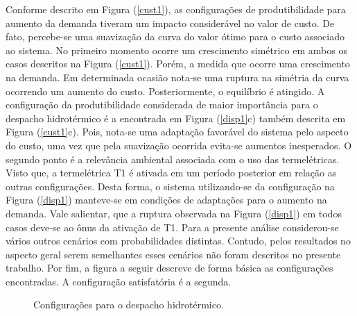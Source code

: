\documentclass[12pt,fleqn]{article}
\begin{document}
Conforme descrito em Figura (\ref{cust1}), as configura\c c\~oes de produtibilidade para aumento da demanda tiveram um
impacto consider\'avel no valor de custo. De fato, percebe-se uma suaviza\c c\~ao da curva do valor \'otimo para o custo
associado ao sistema. No primeiro momento ocorre um crescimento sim\'etrico em ambos os casos descritos na Figura
(\ref{cust1}). Por\'em, a medida que ocorre uma crescimento na demanda. Em determinada ocasi\~ao nota-se uma ruptura na
sim\'etria da curva ocorrendo um aumento do custo. Posteriormente, o equil\'ibrio \'e atingido. A configura\c c\~ao da
produtibilidade considerada de maior import\^ancia para o despacho hidrot\'ermico \'e a encontrada em Figura
(\ref{disp1}c) tamb\'em descrita em Figura (\ref{cust1}c). Pois, nota-se uma adapta\c c\~ao favor\'avel do sistema pelo
aspecto do custo, uma vez que pela suaviza\c c\~ao ocorrida evita-se aumentos inesperados. O segundo ponto  \'e a
relev\^ancia ambiental associada com o uso das termel\'etricas. Visto que, a termel\'etrica T1 \'e ativada em um
per\'iodo posterior em rela\c c\~ao as outras configura\c c\~oes. Desta forma, o sistema utilizando-se da configura\c
c\~ao na Figura (\ref{disp1}) manteve-se em condi\c c\~oes de adapta\c c\~oes para o aumento na demanda. Vale salientar,
que a ruptura observada na Figura (\ref{disp1}) em todos casos deve-se ao \^onus da ativa\c c\~ao de T1. Para a presente
an\'alise considerou-se v\'arios outros cen\'arios com probabilidades distintas. Contudo, pelos resultados no aspecto
geral serem semelhantes esses cen\'arios n\~ao foram descritos no presente trabalho. Por fim, a figura a seguir descreve
de forma b\'asica as configura\c c\~oes encontradas. A configura\c c\~ao satisfat\'oria \'e a segunda.
\begin{figure}[!ht]
    \centering
    
    \caption{Configura\c c\~oes para o despacho hidrot\'ermico.}
\end{figure}
\end{document}
